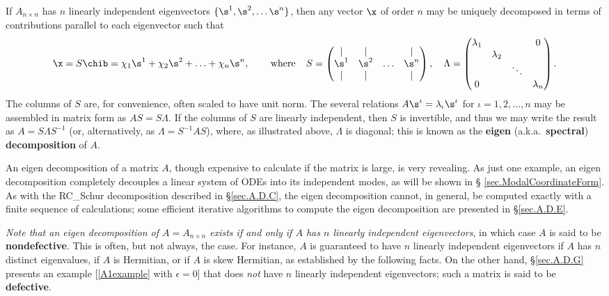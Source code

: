 If $A_{n\times n}$ has $n$ linearly independent eigenvectors
$\{\s^{1},\s^{2},\ldots \s^{n}\}$, then any vector $\x$ of order $n$
may be uniquely decomposed in terms of contributions parallel to each
eigenvector such that
\begin{equation*}
\x=S \chib = \chi_{1}\s^{1}+\chi_{2}\s^{2}+\ldots+\chi_{n}\s^{n}, \hskip0.3in \textrm{where} \hskip0.15in
S=\displaystyle \begin{pmatrix} | & | & & | \\ \s^1 & \s^2 & \ldots & \s^n \\  | & | & & | \end{pmatrix}, \quad
\Lambda=
       \begin{pmatrix} \lambda_1 &   &       & 0 \\
			 & \lambda_2 &       &   \\
			 &   &\ddots &   \\
		       0 &   &       & \lambda_n
		       \end{pmatrix}.
\end{equation*}
The columns of $S$ are, for convenience, often scaled to have unit
norm.  The several relations $A \s^\iota = \lambda_\iota \s^\iota$ for
$\iota = 1, 2, \ldots, n$ may be assembled in matrix form as $A S
= S \Lambda$.  If the columns of $S$ are linearly independent, then
$S$ is invertible, and thus we may write the result as $A = S \Lambda
S^{-1}$ (or, alternatively, as $\Lambda = S^{-1} A S$), where, as
illustrated above, $\Lambda$ is diagonal; this is known as the {\bf eigen} (a.k.a.~{\bf spectral}) {\bf decomposition} of $A$.  

An eigen decomposition of a matrix $A$,
though expensive to calculate if the matrix is large, is very revealing.
As just one example, an eigen decomposition completely decouples
a linear system of ODEs into its independent modes, as will be shown in \S
\ref{sec.ModalCoordinateForm}. As with the RC_Schur decomposition
described in \S \ref{sec.A.D.C}, the eigen decomposition cannot, in
general, be computed exactly with a finite sequence of calculations;
some efficient iterative algorithms to compute the eigen decomposition
are presented in \S \ref{sec.A.D.E}.

{\it Note that an eigen decomposition of $A=A_{n\times n}$
exists if and only if $A$ has $n$ linearly independent eigenvectors}, in which case $A$ is said to be {\bf nondefective}.
This is often, but not always, the case.  For instance, $A$ is
guaranteed to have $n$ linearly independent eigenvectors if $A$ has
$n$ distinct eigenvalues, if $A$ is Hermitian, or if $A$ is skew
Hermitian, as established by the following facts.  On the other hand,
\S \ref{sec.A.D.G} presents an example [\eqref{A1example} with
$\epsilon=0$] that does {\it not} have $n$ linearly independent
eigenvectors; such a matrix is said to be {\bf defective}.

